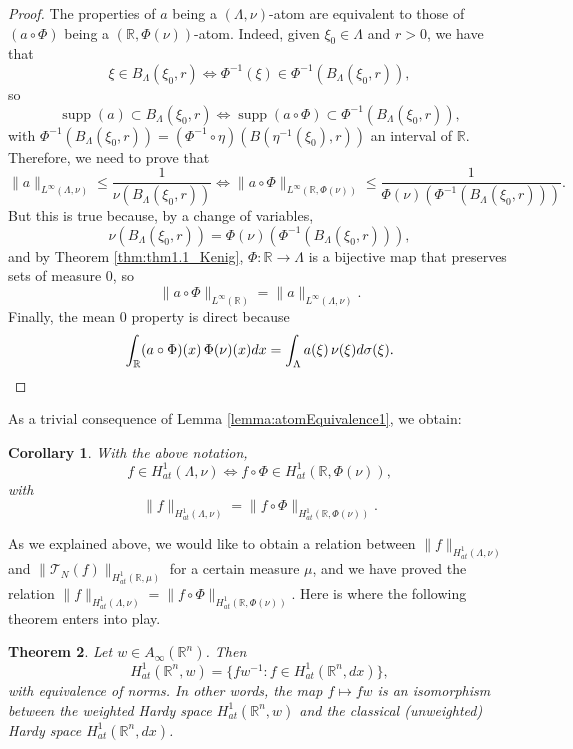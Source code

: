 \documentclass[12pt]{amsart}
\newcommand{\R}{\mathbb{R}}
\newcommand{\supp}[1]{\operatorname{supp}\left(#1\right) }
\theoremstyle{plain}
\newtheorem{theorem}{Theorem}[section]
\newtheorem{corollary}[theorem]{Corollary}
\theoremstyle{definition}
\numberwithin{equation}{section}
\begin{document}
\begin{proof}
    The properties of $a$ being a $(\Lambda,\nu)$-atom are equivalent to those of $(a\circ\Phi)$ being a $(\R,\Phi(\nu))$-atom. Indeed, given $\xi_0\in\Lambda$ and $r>0$, we have that
        \[
        \xi\in B_{\Lambda}(\xi_0,r)
        \iff 
        \Phi^{-1}(\xi)\in \Phi^{-1}(B_{\Lambda}(\xi_0,r)),
        \]
        so
        \[
        \supp{a}\subset B_{\Lambda}(\xi_0,r)
        \iff 
        \supp{a\circ\Phi}
        \subset
        \Phi^{-1}(B_{\Lambda}(\xi_0,r)),
        \]
        with $\Phi^{-1}(B_{\Lambda}(\xi_0,r))=(\Phi^{-1}\circ\eta)(B(\eta^{-1}(\xi_0),r))$ an interval of $\R$.   Therefore, we need to prove that
    \[
    \|a\|_{L^{\infty}(\Lambda,\nu)}\leq \frac{1}{\nu(B_{\Lambda}(\xi_0,r))}
    \iff 
    \|a\circ\Phi\|_{L^{\infty}(\R,\Phi(\nu))}
    \leq 
    \frac{1}{\Phi(\nu)(\Phi^{-1}(B_{\Lambda}(\xi_0,r)))}.
    \]
    But this is true because, by a change of variables,
    \[
    \nu(B_{\Lambda}(\xi_0,r))
    =
    \Phi(\nu)(\Phi^{-1}(B_{\Lambda}(\xi_0,r))),
    \]
    and by Theorem \ref{thm:thm1.1_Kenig}, $\Phi\colon\R\to\Lambda$ is a bijective map that preserves sets of measure $0$, so
    \[
    \|a\circ \Phi\|_{L^\infty(\R)}
    =
    \|a\|_{L^\infty(\Lambda, \nu)}. 
    \]
    Finally, the mean $0$ property is direct because
    \[
    \int_{\R}(a\circ\Phi)(x)\, \Phi(\nu)(x)dx
    =
    \int_{\Lambda}a(\xi)\, \nu(\xi) d\sigma(\xi).\qedhere
    \]
\end{proof}








As a trivial consequence of Lemma \ref{lemma:atomEquivalence1}, we obtain:

\begin{corollary}\label{corol:firstEquivalence}
    With the above notation,
    \[
    f\in H_{at}^1(\Lambda,\nu)
    \iff
    f\circ\Phi\in H_{at}^1(\R,\Phi(\nu)),
    \]
    with
    \[
    \|f\|_{H_{at}^1(\Lambda,\nu)}
    =
    \|f\circ\Phi\|_{H_{at}^1(\R,\Phi(\nu))}.
    \]
\end{corollary}


As we explained above, we would like to obtain a relation between $\|f\|_{H_{at}^1(\Lambda,\nu)}$ and $\|\mathcal{T}_N(f)\|_{H_{at}^1(\R,\mu)}$ for a certain measure $\mu$, and we have proved the relation $\|f\|_{H_{at}^1(\Lambda,\nu)}=\|f\circ\Phi\|_{H_{at}^1(\R,\Phi(\nu))}$. Here is where the following theorem enters into play. 

\begin{theorem}\label{thm:equivalenceWeightedH1}
    Let $w\in A_{\infty}(\R^n)$. Then 
    \[
    H_{at}^1(\R^n,w)
    =
    \{fw^{-1}: f\in H_{at}^1(\R^n,dx)\},
    \]
    with equivalence of norms. In other words, the map $f\mapsto fw$ is an isomorphism between the weighted Hardy space $H_{at}^1(\R^n,w)$ and the classical (unweighted) Hardy space $H_{at}^1(\R^n,dx)$.
\end{theorem}
\end{document}
